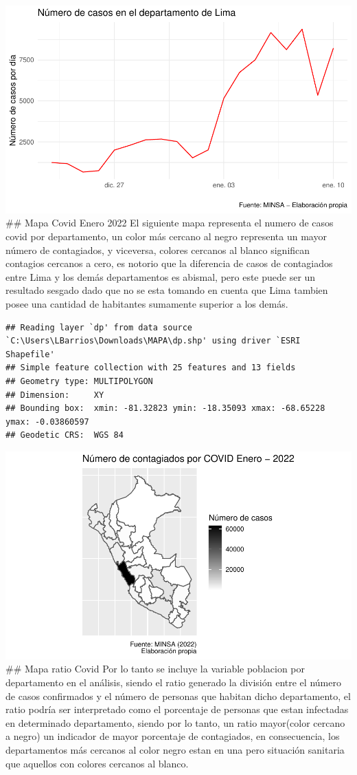 \documentclass[
]{article}
\begin{document}
\includegraphics[width=0.8\linewidth]{reporte_covid_files/figure-latex/total -1}
\#\# Mapa Covid Enero 2022 El siguiente mapa representa el numero de
casos covid por departamento, un color más cercano al negro representa
un mayor número de contagiados, y viceversa, colores cercanos al blanco
significan contagios cercanos a cero, es notorio que la diferencia de
casos de contagiados entre Lima y los demás departamentos es abismal,
pero este puede ser un resultado sesgado dado que no se esta tomando en
cuenta que Lima tambien posee una cantidad de habitantes sumamente
superior a los demás.

\begin{verbatim}
## Reading layer `dp' from data source `C:\Users\LBarrios\Downloads\MAPA\dp.shp' using driver `ESRI Shapefile'
## Simple feature collection with 25 features and 13 fields
## Geometry type: MULTIPOLYGON
## Dimension:     XY
## Bounding box:  xmin: -81.32823 ymin: -18.35093 xmax: -68.65228 ymax: -0.03860597
## Geodetic CRS:  WGS 84
\end{verbatim}

\includegraphics[width=0.8\linewidth]{reporte_covid_files/figure-latex/mapa1-1}
\#\# Mapa ratio Covid Por lo tanto se incluye la variable poblacion por
departamento en el análisis, siendo el ratio generado la división entre
el número de casos confirmados y el número de personas que habitan dicho
departamento, el ratio podría ser interpretado como el porcentaje de
personas que estan infectadas en determinado departamento, siendo por lo
tanto, un ratio mayor(color cercano a negro) un indicador de mayor
porcentaje de contagiados, en consecuencia, los departamentos más
cercanos al color negro estan en una pero situación sanitaria que
aquellos con colores cercanos al blanco.
\end{document}
